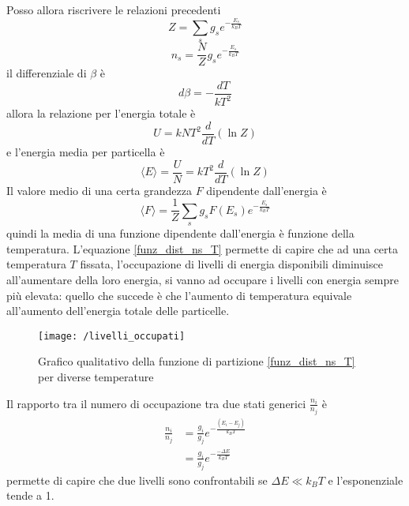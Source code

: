 Posso allora riscrivere le relazioni precedenti 
\begin{equation}
Z = \sum_s g_s e^{ - \frac{E_s}{k_B T} }
\end{equation}
\begin{equation}
n_s = \frac{N}{Z} g_s e^{ - \frac{E_s}{k_B T} }
\label{funz_dist_ns_T}
\end{equation}
il differenziale di $\beta$ è
\begin{equation}
d \beta = - \frac{d T}{k T^2}
\end{equation}
allora la relazione per l'energia totale è
\begin{equation}
U = k N T^2 \frac{d}{dT} (\ln Z)
\end{equation}
e l'energia media per particella è
\begin{equation}
\langle E \rangle = \frac{U}{N} = k T^2 \frac{d}{dT} (\ln Z)
\end{equation}
Il valore medio di una certa grandezza $F$ dipendente dall'energia è
\begin{equation}
\langle F \rangle = \frac{1}{Z} \sum_s g_s F(E_s) e^{ -\frac{E_s}{k_B T} }
\end{equation}
quindi la media di una funzione dipendente dall'energia è funzione della temperatura.
L'equazione \ref{funz_dist_ns_T} permette di capire che ad una certa temperatura $T$ fissata, l'occupazione di livelli di energia disponibili diminuisce all'aumentare della loro energia, si vanno ad occupare i livelli con energia sempre più elevata: 
quello che succede è che l'aumento di temperatura equivale all'aumento dell'energia totale delle particelle.
\begin{figure}[h]
\centering
\texttt{[image: /livelli\_occupati]}
\caption{Grafico qualitativo della funzione di partizione \ref{funz_dist_ns_T} per diverse temperature }
\end{figure}

Il rapporto tra il numero di occupazione tra due stati generici $\frac{n_i}{n_j}$ è 
\begin{equation}
\begin{split}
\frac{n_i}{n_j} & = \frac{g_i}{g_j} e^{ - \frac{(E_i - E_j)}{k_B T} } \\
& = \frac{g_i}{g_j} e^{ - \frac{- \Delta E}{k_B T} }
\end{split}
\end{equation}
permette di capire che due livelli sono confrontabili se $\Delta E \ll k_B T$ e l'esponenziale tende a 1.


